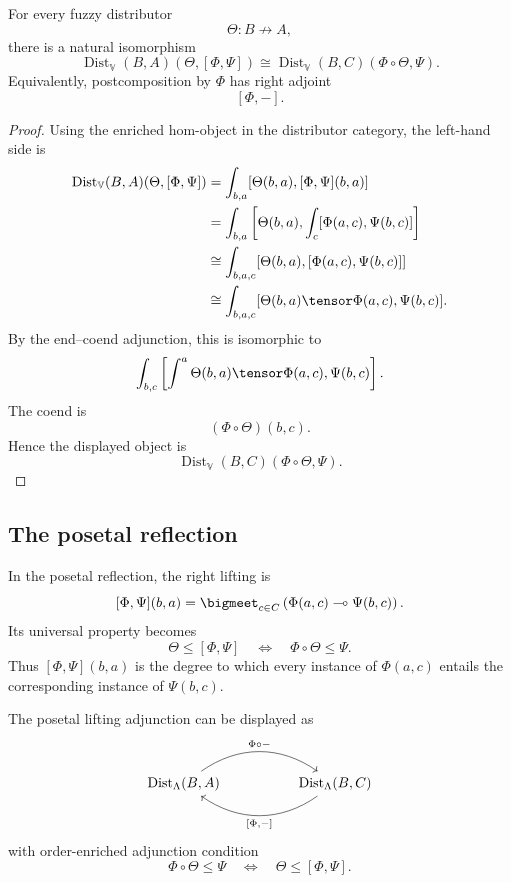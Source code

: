 \begin{proposition}
\label{prop:right-lifting-universal-property}
For every fuzzy distributor
\[
    \Theta:B\nrightarrow A,
\]
there is a natural isomorphism
\[
    \operatorname{Dist}_{\mathbb V}(B,A)(\Theta,[\Phi,\Psi])
    \cong
    \operatorname{Dist}_{\mathbb V}(B,C)(\Phi\circ\Theta,\Psi).
\]
Equivalently, postcomposition by \(\Phi\) has right adjoint
\[
    [\Phi,-].
\]
\end{proposition}

\begin{proof}
Using the enriched hom-object in the distributor category, the left-hand side is
\[
\begin{aligned}
\operatorname{Dist}_{\mathbb V}(B,A)(\Theta,[\Phi,\Psi])
&=
\int_{b,a}
[
    \Theta(b,a),
    [\Phi,\Psi](b,a)
]
\\
&=
\int_{b,a}
\left[
    \Theta(b,a),
    \int_c[\Phi(a,c),\Psi(b,c)]
\right]
\\
&\cong
\int_{b,a,c}
[
    \Theta(b,a),
    [\Phi(a,c),\Psi(b,c)]
]
\\
&\cong
\int_{b,a,c}
[
    \Theta(b,a)\tensor\Phi(a,c),
    \Psi(b,c)
].
\end{aligned}
\]
By the end--coend adjunction, this is isomorphic to
\[
    \int_{b,c}
    \left[
        \int^{a}
        \Theta(b,a)\tensor\Phi(a,c),
        \Psi(b,c)
    \right].
\]
The coend is
\[
    (\Phi\circ\Theta)(b,c).
\]
Hence the displayed object is
\[
    \operatorname{Dist}_{\mathbb V}(B,C)(\Phi\circ\Theta,\Psi).
\]
\end{proof}

\subsection{The posetal reflection}
\label{subsec:right-liftings-posetal}

In the posetal reflection, the right lifting is
\[
    [\Phi,\Psi](b,a)
    =
    \bigmeet_{c\in C}
    \left(
        \Phi(a,c)\multimap\Psi(b,c)
    \right).
\]
Its universal property becomes
\[
    \Theta\leq[\Phi,\Psi]
    \quad\Longleftrightarrow\quad
    \Phi\circ\Theta\leq\Psi.
\]
Thus \([\Phi,\Psi](b,a)\) is the degree to which every instance of
\(\Phi(a,c)\) entails the corresponding instance of \(\Psi(b,c)\).

The posetal lifting adjunction can be displayed as
\[
\begin{tikzcd}[column sep=huge,row sep=large]
\operatorname{Dist}_{\Lambda}(B,A)
    \ar[r,bend left=35,"{\Phi\circ -}"]
&
\operatorname{Dist}_{\Lambda}(B,C)
    \ar[l,bend left=35,"{[\Phi,-]}"]
\end{tikzcd}
\]
with order-enriched adjunction condition
\[
    \Phi\circ\Theta\leq\Psi
    \quad\Longleftrightarrow\quad
    \Theta\leq[\Phi,\Psi].
\]

